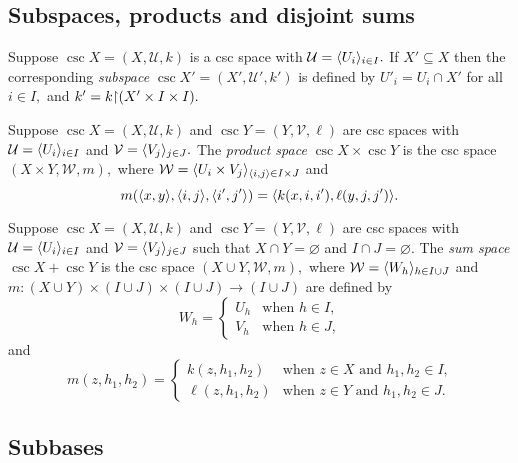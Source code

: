\documentclass[csc]{subfiles}
\begin{document}
\subsection*{Subspaces, products and disjoint sums}

\begin{definition}[\RCA]
  Suppose \(\csc{X}=(X,\mathcal{U},k)\) is a csc space with \(\mathcal{U} = \langle U_i\rangle_{i \in I}.\) 
  If \(X' \subseteq X\) then the corresponding \emph{subspace} \(\csc{X}'=(X',\mathcal{U}',k')\) is defined by \(U'_i = U_i \cap X'\) for all \(i \in I,\) and \(k' = k{\upharpoonright}(X'\times I \times I).\)
\end{definition}

\begin{definition}[\RCA]
  Suppose \(\csc{X}=(X,\mathcal{U},k)\) and \(\csc{Y}=(Y,\mathcal{V},\ell)\) are csc spaces with \(\mathcal{U} = \langle U_i\rangle_{i \in I}\) and \(\mathcal{V} = \langle V_j\rangle_{j \in J}.\)
  The \emph{product space} \(\csc{X}\times\csc{Y}\) is the csc space \((X \times Y, \mathcal{W}, m),\) where \(\mathcal{W} = \langle U_i \times V_j\rangle_{\langle i,j\rangle \in I \times J}\) and \[m(\langle x,y\rangle,\langle i,j\rangle,\langle i',j'\rangle) = \langle k(x,i,i'),\ell(y,j,j')\rangle.\]
\end{definition}

\begin{definition}[\RCA]
  Suppose \(\csc{X}=(X,\mathcal{U},k)\) and \(\csc{Y}=(Y,\mathcal{V},\ell)\) are csc spaces with \(\mathcal{U} = \langle U_i\rangle_{i \in I}\) and \(\mathcal{V} = \langle V_j\rangle_{j \in J}\) such that \(X \cap Y = \varnothing\) and \(I \cap J = \varnothing.\)
  The \emph{sum space} \(\csc{X}+\csc{Y}\) is the csc space \((X \cup Y, \mathcal{W}, m),\) where \(\mathcal{W} = \langle W_h\rangle_{h \in I \cup J}\) and \(m:(X \cup Y)\times(I \cup J)\times(I \cup J) \to (I \cup J)\) are defined by \[W_h = \begin{cases} U_h & \text{when $h \in I$,} \\ V_h & \text{when $h \in J$,} \end{cases}\] and \[m(z,h_1,h_2) = \begin{cases} k(z,h_1,h_2) & \text{when $z \in X$ and $h_1,h_2 \in I$,} \\ \ell(z,h_1,h_2) & \text{when $z \in Y$ and $h_1,h_2 \in J$.} \end{cases}\]
\end{definition}

\subsection*{Subbases}
\end{document}
